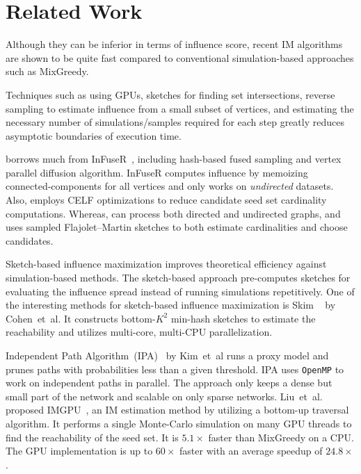 \documentclass[10pt,journal,compsoc]{IEEEtran}
\newcommand\acro{{\sc{HyperFuseR\xspace}\xspace}\xspace}
\begin{document}
\section{Related Work}\label{sec:relatedwork}

Although they can be inferior in terms of influence score, recent IM algorithms are shown to be quite fast compared to conventional simulation-based approaches such as {\sc MixGreedy}. 

Techniques such as using GPUs\cite{IMGPU,curipples}, sketches for finding set intersections\cite{cohen2014sketch,IPA}, reverse sampling to estimate influence from a small subset of vertices\cite{borgs2014maximizing,minutoli2019fast}, and estimating the necessary number of simulations/samples required for each step greatly reduces asymptotic boundaries of execution time\cite{leskovec2009community}.

\acro borrows much from {\sc InFuseR}~\cite{infuser}, including hash-based fused sampling and vertex parallel diffusion algorithm. {\sc InFuseR} computes influence by memoizing connected-components for all vertices and only works on {\em undirected} datasets. Also, employs CELF optimizations to reduce candidate seed set cardinality computations. Whereas, \acro can process both directed and undirected graphs, and uses sampled Flajolet–Martin sketches to both estimate cardinalities and choose candidates. 

Sketch-based influence maximization improves theoretical efficiency against simulation-based methods. The sketch-based approach pre-computes sketches for evaluating the influence spread instead of running simulations repetitively. One of the interesting methods for sketch-based influence maximization is {\sc Skim} ~\cite{cohen2014sketch} by Cohen~et~al. It constructs bottom-$K^2$ min-hash sketches to estimate the reachability and utilizes multi-core, multi-CPU parallelization. 

Independent Path Algorithm~(IPA)~\cite{IPA} by Kim~et~al runs a proxy model and prunes paths with probabilities less than a given threshold. IPA uses {\tt OpenMP} to work on independent paths in parallel. The approach only keeps a dense but small part of the network and scalable on only sparse networks. Liu~et~al. proposed IMGPU~\cite{IMGPU}, an IM  estimation method by utilizing a bottom-up traversal algorithm. It performs a single Monte-Carlo simulation on many GPU threads to find the reachability of the seed set. It is $5.1\times$ faster than {\sc MixGreedy} on a CPU. The GPU implementation is up to $60\times$ faster with an average speedup of  $24.8\times$.
\end{document}
